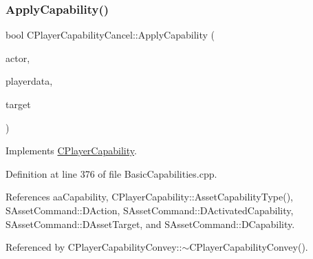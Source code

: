 \subsubsection{\texorpdfstring{Apply\+Capability()}{ApplyCapability()}}
{\footnotesize\ttfamily bool C\+Player\+Capability\+Cancel\+::\+Apply\+Capability (\begin{DoxyParamCaption}\item[{std\+::shared\+\_\+ptr$<$ \hyperlink{classCPlayerAsset}{C\+Player\+Asset} $>$}]{actor,  }\item[{std\+::shared\+\_\+ptr$<$ \hyperlink{classCPlayerData}{C\+Player\+Data} $>$}]{playerdata,  }\item[{std\+::shared\+\_\+ptr$<$ \hyperlink{classCPlayerAsset}{C\+Player\+Asset} $>$}]{target }\end{DoxyParamCaption})\hspace{0.3cm}{\ttfamily [virtual]}}



Implements \hyperlink{classCPlayerCapability_a2ca6fd7fbd9c0178f1cf1d049c63825f}{C\+Player\+Capability}.



Definition at line 376 of file Basic\+Capabilities.\+cpp.



References aa\+Capability, C\+Player\+Capability\+::\+Asset\+Capability\+Type(), S\+Asset\+Command\+::\+D\+Action, S\+Asset\+Command\+::\+D\+Activated\+Capability, S\+Asset\+Command\+::\+D\+Asset\+Target, and S\+Asset\+Command\+::\+D\+Capability.



Referenced by C\+Player\+Capability\+Convey\+::$\sim$\+C\+Player\+Capability\+Convey().



